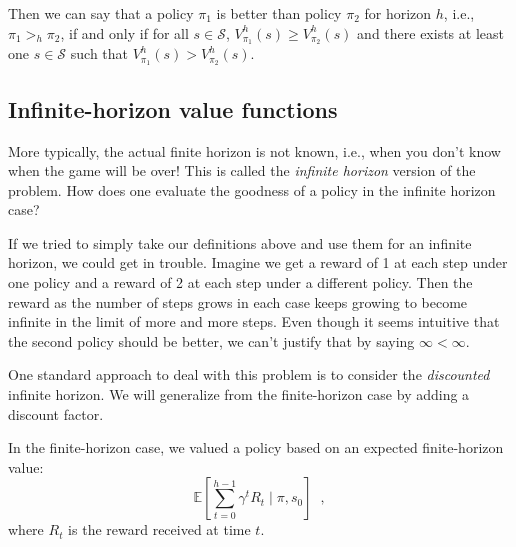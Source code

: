 

Then we can say that a policy $\pi_1$ is better than policy $\pi_2$ for horizon
$h$, i.e., $\pi_1 >_h \pi_2$, if and only if for all $s \in \mathcal S$,
$V_{\pi_1}^h(s) \geq V_{\pi_2}^h(s)$ and there exists at least one $s
  \in \mathcal S$ such that $V_{\pi_1}^h(s) > V_{\pi_2}^h(s)$.

\subsection{Infinite-horizon value functions}
\label{sec-mdp_infinite_horizon}
\label{sec-discount}

More typically, the actual finite horizon is not known, i.e., when you
don't know when the game will be over!  This is called the {\em
    infinite horizon} version of the problem.  How does one evaluate the
goodness of a policy in the infinite horizon case?

If we tried to simply take our definitions above and use them for an
infinite horizon, we could get in trouble. Imagine we get a reward of
1 at each step under one policy and a reward of 2 at each step under a
different policy. Then the reward as the number of steps grows in each
case keeps growing to become infinite in the limit of more and more
steps. Even though it seems intuitive that the second policy should
be better, we can't justify that by saying $\infty < \infty$.

One standard approach to deal with this problem is to consider the
\emph{discounted} infinite horizon.
We will generalize from the finite-horizon case by adding a discount factor.

In the finite-horizon case, we valued a
policy based on an expected finite-horizon value:
\begin{equation}
  \mathbb{E}\left[\sum_{t = 0}^{h-1} \gamma^t R_t \mid \pi, s_0\right]\;\;,
  \label{eq:exp_finite}
\end{equation}
where $R_t$ is the reward received at time $t$.

